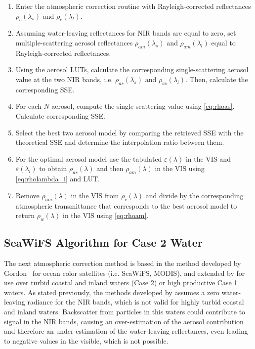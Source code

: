 \begin{enumerate}[itemsep=2pt,parsep=2pt]
  \item Enter the atmospheric correction routine with Rayleigh-corrected reflectances $\rho_c(\lambda_s)$ and $\rho_c(\lambda_l)$.
  \item Assuming water-leaving reflectances for NIR bands are equal to zero, set multiple-scattering aerosol reflectances $\rho_{am}(\lambda_s)$ and $\rho_{am}(\lambda_l)$ equal to Rayleigh-corrected reflectances.
  \item Using the aerosol LUTs, calculate the corresponding single-scattering aerosol value at the two NIR bands, i.e. $\rho_{as}(\lambda_s)$ and $\rho_{as}(\lambda_l)$. Then, calculate the corresponding SSE.
  \item For each $N$ aerosol, compute the single-scattering value using \autoref{eq:rhoas}. Calculate corresponding SSE.
  \item Select the best two aerosol model by comparing the retrieved SSE with the theoretical SSE and determine the interpolation ratio between them.
  \item For the optimal aerosol model use the tabulated $\varepsilon(\lambda)$ in the VIS and $\varepsilon(\lambda_l)$ to obtain $\rho_{as}(\lambda)$ and then $\rho_{am}(\lambda)$ in the VIS using \autoref{eq:rholambda_i} and LUT.
  \item Remove $\rho_{am}(\lambda)$ in the VIS from $\rho_c(\lambda)$ and divide by the corresponding atmospheric transmittance that corresponds to the best aerosol model to return $\rho_w(\lambda)$ in the VIS using \autoref{eq:rhoam}.
\end{enumerate}

\subsection{SeaWiFS Algorithm for Case 2 Water}\label{subsec:ruddick}

The next atmospheric correction method is based in the method developed by Gordon~\cite{Gordon:1997} for ocean color satellites (i.e. SeaWiFS, MODIS), and extended by \cite{Ruddick:2000bs} for use over turbid coastal and inland waters (Case 2) or high productive Case 1 waters. As stated previously, the methods developed by \cite{Gordon:1994} assumes a zero water-leaving radiance for the NIR bands, which is not valid for highly turbid coastal and inland waters. Backscatter from particles in this waters could contribute to signal in the NIR bands, causing an over-estimation of the aerosol contribution and therefore an under-estimation of the water-leaving reflectances, even leading to negative values in the visible, which is not possible. 


